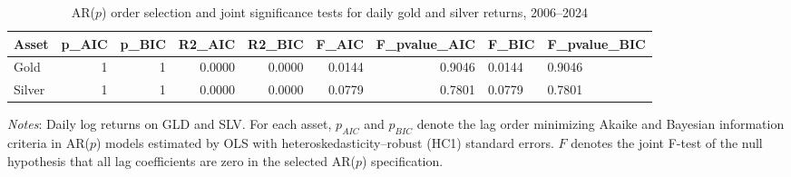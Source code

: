 \begin{table}[H]
\centering
\caption{AR($p$) order selection and joint significance tests for daily gold and silver returns, 2006--2024}
\label{tab:arp-selection}
\begin{tabular}{lrrrrrr}
\toprule
Asset & p_AIC & p_BIC & R2_AIC & R2_BIC & F_AIC & F_pvalue_AIC & F_BIC & F_pvalue_BIC \\
\midrule
Gold & 1 & 1 & 0.0000 & 0.0000 & 0.0144 & 0.9046 & 0.0144 & 0.9046 \\
Silver & 1 & 1 & 0.0000 & 0.0000 & 0.0779 & 0.7801 & 0.0779 & 0.7801 \\
\bottomrule
\end{tabular}

\vspace{0.2cm}
\begin{minipage}{0.9\textwidth}
\footnotesize
\textit{Notes}: Daily log returns on GLD and SLV. For each asset, $p_{AIC}$ and $p_{BIC}$ denote the lag order minimizing Akaike and Bayesian information criteria in AR($p$) models estimated by OLS with heteroskedasticity--robust (HC1) standard errors. $F$ denotes the joint F-test of the null hypothesis that all lag coefficients are zero in the selected AR($p$) specification.
\end{minipage}
\end{table}
